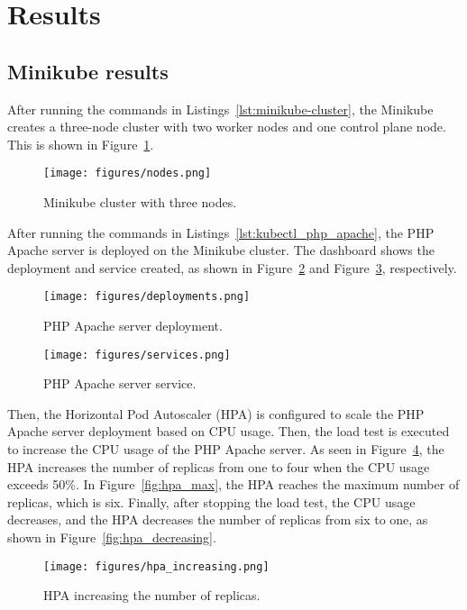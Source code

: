 \section{Results}
\subsection{Minikube results}
After running the commands in Listings~\ref{lst:minikube-cluster}, the Minikube creates a three-node cluster with two worker nodes and one control plane node.
This is shown in Figure~\ref{fig:minikube-cluster}.

\begin{figure}[!htbp]
  \centering
  \texttt{[image: figures/nodes.png]}
  \caption{Minikube cluster with three nodes.}
  \label{fig:minikube-cluster}
\end{figure}

After running the commands in Listings~\ref{lst:kubectl_php_apache}, the PHP Apache server is deployed on the Minikube cluster.
The dashboard shows the deployment and service created, as shown in Figure~\ref{fig:deployments} and Figure~\ref{fig:services}, respectively.

\begin{figure}[!htbp]
  \centering
  \texttt{[image: figures/deployments.png]}
  \caption{PHP Apache server deployment.}
  \label{fig:deployments}
\end{figure}

\begin{figure}[!htbp]
  \centering
  \texttt{[image: figures/services.png]}
  \caption{PHP Apache server service.}
  \label{fig:services}
\end{figure}

Then, the Horizontal Pod Autoscaler (HPA) is configured to scale the PHP Apache server deployment based on CPU usage.
Then, the load test is executed to increase the CPU usage of the PHP Apache server.
As seen in Figure~\ref{fig:hpa_increasing}, the HPA increases the number of replicas from one to four when the CPU usage exceeds 50\%.
In Figure~\ref{fig:hpa_max}, the HPA reaches the maximum number of replicas, which is six.
Finally, after stopping the load test, the CPU usage decreases, and the HPA decreases the number of replicas from six to one, as shown in Figure~\ref{fig:hpa_decreasing}.

\begin{figure}[!htbp]
  \centering
  \texttt{[image: figures/hpa\_increasing.png]}
  \caption{HPA increasing the number of replicas.}
  \label{fig:hpa_increasing}
\end{figure}

